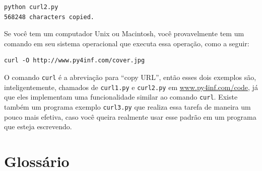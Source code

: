 \beforeverb
\begin{verbatim}
python curl2.py 
568248 characters copied.
\end{verbatim}
\afterverb

Se você tem um computador Unix ou Macintosh, você provavelmente tem um comando
em seu sistema operacional que executa essa operação, como a seguir:

\beforeverb
\begin{verbatim}
curl -O http://www.py4inf.com/cover.jpg
\end{verbatim}
\afterverb

O comando {\tt curl} é a abreviação para ``copy URL'', então esses dois
exemplos são, inteligentemente, chamados de {\tt curl1.py} e {\tt curl2.py} em
\url{www.py4inf.com/code}, já que eles implementam uma funcionalidade similar
ao comando {\tt curl}.  Existe também um programa exemplo {\tt curl3.py} que
realiza essa tarefa de maneira um pouco mais efetiva, caso você queira
realmente usar esse padrão em um programa que esteja escrevendo.

\section{Glossário}

